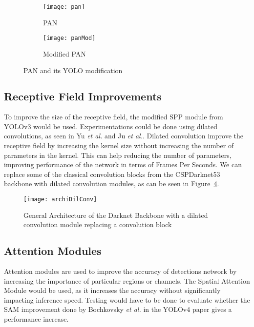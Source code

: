 \begin{figure}[H]
     \centering
     \begin{subfigure}[b]{0.3\textwidth}
         \centering
         \texttt{[image: pan]}
         \caption{PAN}
         \label{fig:pan}
     \end{subfigure}
     \begin{subfigure}[b]{0.3\textwidth}
         \centering
         \texttt{[image: panMod]}
         \caption{Modified PAN}
         \label{fig:panmod}
     \end{subfigure}
   \caption{PAN and its YOLO modification}
   \label{fig:PAN}
\end{figure}

\subsection{Receptive Field Improvements}
To improve the size of the receptive field, the modified SPP module from YOLOv3\cite{yolov3} would be used. Experimentations could be done using dilated convolutions, as seen in Yu \textit{et al.}\cite{yu2015} and Ju \textit{et al.}. Dilated convolution improve the receptive field by increasing the kernel size without increasing the number of parameters in the kernel. This can help reducing the number of parameters, improving performance of the network in terms of Frames Per Seconds. We can replace some of the classical convolution blocks from the CSPDarknet53 backbone with dilated convolution modules, as can be seen in Figure~\ref{fig:dilConvDarknet}. 

\begin{figure}[H]
  \centering
  \texttt{[image: archiDilConv]}
	\caption[]{General Architecture of the Darknet Backbone with a dilated convolution module replacing a convolution block}
  \label{fig:dilConvDarknet}
\end{figure}

\subsection{Attention Modules}
Attention modules are used to improve the accuracy of detections network by increasing the importance of particular regions or channels. The Spatial Attention Module\cite{sam} would be used, as it increases the accuracy without significantly impacting inference speed. Testing would have to be done to evaluate whether the SAM improvement done by Bochkovsky \textit{et al.} in the YOLOv4 paper\cite{yolov4} gives a performance increase.

